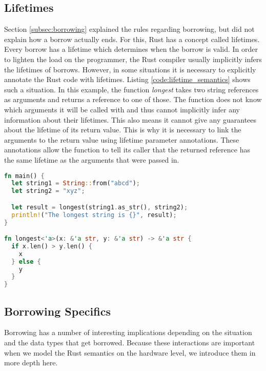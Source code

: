 \subsection{Lifetimes}
Section \ref{subsec:borrowing} explained the rules regarding borrowing, but did not explain how a borrow actually ends.
For this, Rust has a concept called lifetimes.
Every borrow has a lifetime which determines when the borrow is valid.
In order to lighten the load on the programmer, the Rust compiler usually implicitly infers the lifetimes of borrows.
However, in some situations it is necessary to explicitly annotate the Rust code with lifetimes.
Listing \ref{code:lifetime_semantics} shows such a situation.
In this example, the function \textit{longest} takes two string references as arguments and returns a reference to one of those.
The function does not know which arguments it will be called with and thus cannot implicitly infer any information about their lifetimes.
This also means it cannot give any guarantees about the lifetime of its return value.
This is why it is necessary to link the arguments to the return value using lifetime parameter annotations.
These annotations allow the function to tell its caller that the returned reference has the same lifetime as the arguments that were passed in.
\begin{lstlisting}[language=Rust,frame=single,caption=Lifetime Example,label=code:lifetime_semantics]
fn main() {
  let string1 = String::from("abcd");
  let string2 = "xyz";

  let result = longest(string1.as_str(), string2);
  println!("The longest string is {}", result);
}

fn longest<'a>(x: &'a str, y: &'a str) -> &'a str {
  if x.len() > y.len() {
    x
  } else {
    y
  }
}
\end{lstlisting} %
\label{fig:lifetime_semantics}

\subsection{Borrowing Specifics}
Borrowing has a number of interesting implications depending on the situation and the data types that get borrowed.
Because these interactions are important when we model the Rust semantics on the hardware level, we introduce them in more depth here.

